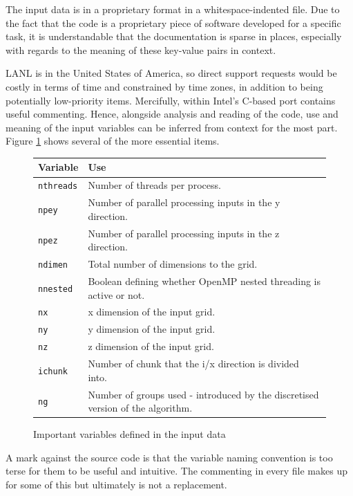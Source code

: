 \documentclass[conference]{IEEEtran}
\begin{document}
The input data is in a proprietary format in a whitespace-indented file. Due to the fact that the code is a proprietary piece of software developed for a specific task, it is understandable that the documentation is sparse in places, especially with regards to the meaning of these key-value pairs in context.

LANL is in the United States of America, so direct support requests would be costly in terms of time and constrained by time zones, in addition to being potentially low-priority items. Mercifully, within Intel's C-based port contains useful commenting. Hence, alongside analysis and reading of the code, use and meaning of the input variables can be inferred from context for the most part. Figure \ref{table:input-data} shows several of the more essential items. 

\begin{figure}[h]
    \centering
    \begin{tabular}{| p{1.7cm} | p{5.7cm} |}
        \hline
        Variable & Use \\
        \hline
        \texttt{nthreads} & Number of threads per process. \\
        \texttt{npey} & Number of parallel processing inputs in the y direction. \\
        \texttt{npez} & Number of parallel processing inputs in the z direction. \\
        \texttt{ndimen} & Total number of dimensions to the grid. \\
        \texttt{nnested} & Boolean defining whether OpenMP nested threading is active or not.\\
        \texttt{nx} & x dimension of the input grid. \\
        \texttt{ny} & y dimension of the input grid. \\
        \texttt{nz} & z dimension of the input grid. \\
        \texttt{ichunk} & Number of chunk that the i/x direction is divided into. \\
        \texttt{ng} & Number of groups used - introduced by the discretised version of the algorithm. \\
        \hline
    \end{tabular}
    \caption{Important variables defined in the input data}
    \label{table:input-data}
\end{figure}

A mark against the source code is that the variable naming convention is too terse for them to be useful and intuitive. The commenting in every file makes up for some of this but ultimately is not a replacement.
\end{document}
